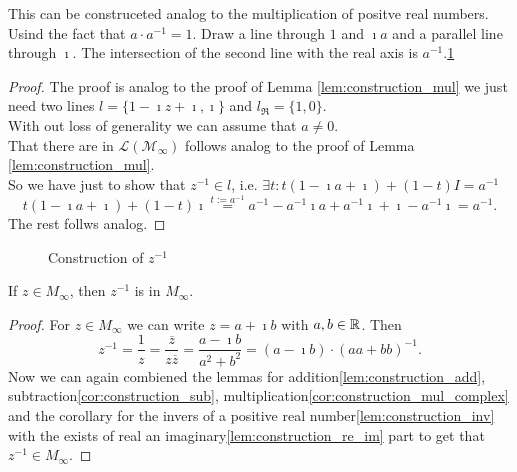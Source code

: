 This can be construceted analog to the multiplication of positve real numbers. Usind the fact that $a\cdot a^{-1} = 1$. Draw a line through $1$ and $\imath a$ and a parallel line through $\imath$. The intersection of the second line with the real axis is $a^{-1}$.\ref{Fig.6}
\begin{proof}
    The proof is analog to the proof of Lemma \ref{lem:construction_mul} we just need two lines $l = \{1-\imath z + \imath, \imath\}$ and $l_{\Re} = \{1,0\}$.\\
    With  out loss of generality we can assume that $a \ne 0$.\\
    That there are in $\mathcal{L(M_{\infty})}$ follows analog to the proof of Lemma \ref{lem:construction_mul}.\\ 
    So we have just to show that $z^{-1} \in l$, i.e. $\exists t: t  (1 - \imath a + \imath) + (1 - t)  I = a^{-1}$ $$t  (1 - \imath a + \imath) + (1 - t)  \imath \stackrel{t:=a^{-1}}{=}  a^{-1} - a^{-1} \imath a + a^{-1}\imath + \imath - a^{-1}\imath = a^{-1}.$$
    The rest follws analog.
\end{proof}
\begin{figure}
    \centering
    \caption{Construction of $z^{-1}$}
    \label{Fig.6}
\end{figure}

\begin{corollary}
    \label{cor:inv_M_inf}
    \leanok
    If $z \in M_{\infty}$, then $z^{-1}$ is in  $M_{\infty}$.
\end{corollary}
\begin{proof}
    For $z \in M_{\infty}$ we can write $z = a + \imath b$ with $a, b \in \mathbb{R}$. Then
    $$z^{-1} = \frac{1}{z} = \frac{\overline{z}}{z\overline{z}} = \frac{a - \imath b}{a^2+b^2}= (a - \imath b) \cdot (aa+bb)^{-1}.$$
    Now we can again combiened the lemmas for addition\ref{lem:construction_add}, subtraction\ref{cor:construction_sub}, multiplication\ref{cor:construction_mul_complex} and the corollary for the invers of a positive real number\ref{lem:construction_inv} with the exists of real an imaginary\ref{lem:construction_re_im} part to get that $z^{-1} \in M_{\infty}$.
\end{proof}